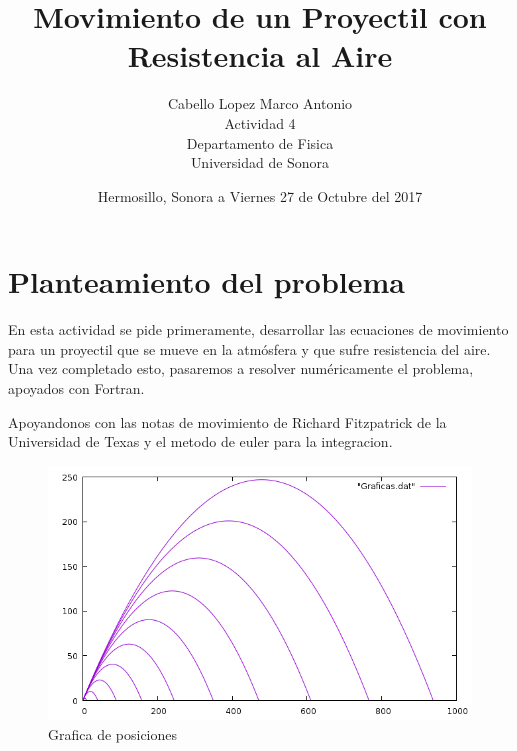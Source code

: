 \documentclass[12pt,a4paper,twoside]{article}
\author{Cabello Lopez Marco Antonio\\
Actividad 4 \\
Departamento de Fisica\\
Universidad de Sonora}
\date{Hermosillo, Sonora a Viernes 27 de Octubre del 2017}
\title{\textbf{Movimiento de un Proyectil con Resistencia al Aire}}
\begin{document}
\maketitle
\section{Planteamiento del problema}
En esta actividad se pide primeramente, desarrollar las ecuaciones de movimiento para un proyectil que se mueve en la atmósfera y que sufre resistencia del aire. Una vez completado esto, pasaremos a resolver numéricamente el problema, apoyados con Fortran.

Apoyandonos con las notas de movimiento de Richard Fitzpatrick de la Universidad de Texas y el metodo de euler para la integracion.

\begin{figure}[h!]
  \includegraphics[width=\linewidth]{sistema.png}
  \caption{Grafica de posiciones}
  \label{fig:Grafica}
\end{figure}
\end{document}
